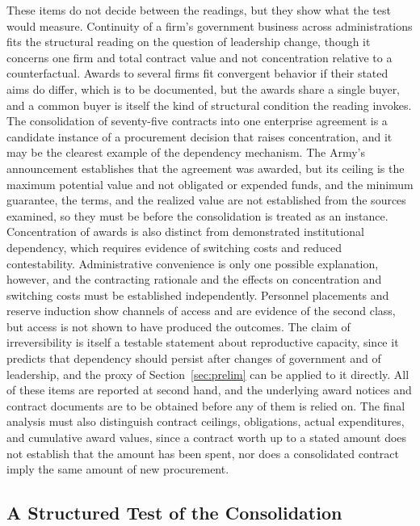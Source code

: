 \documentclass[12pt]{article}
\theoremstyle{remark}
\begin{document}
These items do not decide between the readings, but they show what the test would measure. Continuity of a firm's government business across administrations fits the structural reading on the question of leadership change, though it concerns one firm and total contract value and not concentration relative to a counterfactual. Awards to several firms fit convergent behavior if their stated aims do differ, which is to be documented, but the awards share a single buyer, and a common buyer is itself the kind of structural condition the reading invokes. The consolidation of seventy-five contracts into one enterprise agreement is a candidate instance of a procurement decision that raises concentration, and it may be the clearest example of the dependency mechanism. The Army's announcement establishes that the agreement was awarded, but its ceiling is the maximum potential value and not obligated or expended funds, and the minimum guarantee, the terms, and the realized value are not established from the sources examined, so they must be before the consolidation is treated as an instance. Concentration of awards is also distinct from demonstrated institutional dependency, which requires evidence of switching costs and reduced contestability. Administrative convenience is only one possible explanation, however, and the contracting rationale and the effects on concentration and switching costs must be established independently. Personnel placements and reserve induction show channels of access and are evidence of the second class, but access is not shown to have produced the outcomes. The claim of irreversibility is itself a testable statement about reproductive capacity, since it predicts that dependency should persist after changes of government and of leadership, and the proxy of Section~\ref{sec:prelim} can be applied to it directly. All of these items are reported at second hand, and the underlying award notices and contract documents are to be obtained before any of them is relied on. The final analysis must also distinguish contract ceilings, obligations, actual expenditures, and cumulative award values, since a contract worth up to a stated amount does not establish that the amount has been spent, nor does a consolidated contract imply the same amount of new procurement.

\subsection{A Structured Test of the Consolidation}
\end{document}
